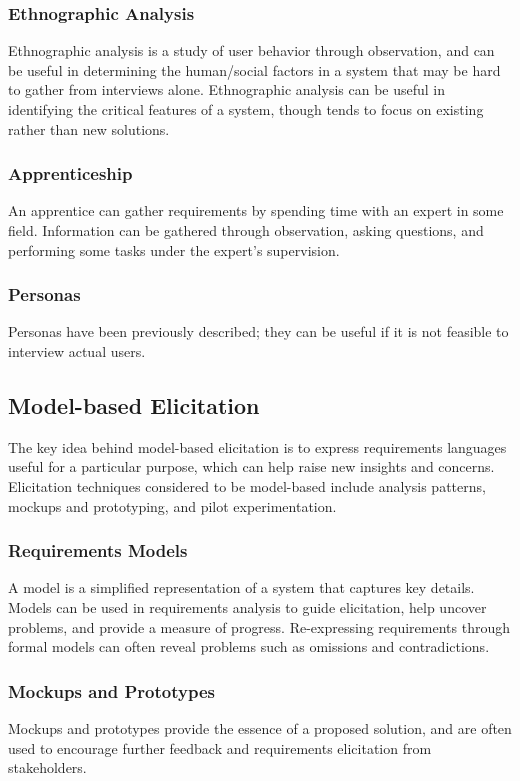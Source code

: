 \documentclass[12pt,titlepage]{article}
\begin{document}
      \subsubsection{Ethnographic Analysis}
        Ethnographic analysis is a study of user behavior through observation, and can be useful in determining the human/social factors in a system that
        may be hard to gather from interviews alone. Ethnographic analysis can be useful in identifying the critical features of a system, though tends to focus on
        existing rather than new solutions.

      \subsubsection{Apprenticeship}
        An apprentice can gather requirements by spending time with an expert in some field. Information can be gathered through observation, asking questions, and
        performing some tasks under the expert's supervision.

      \subsubsection{Personas}
        Personas have been previously described; they can be useful if it is not feasible to interview actual users.

    \subsection{Model-based Elicitation}
      The key idea behind model-based elicitation is to express requirements languages useful for a particular purpose, which can help raise new insights and concerns.
      Elicitation techniques considered to be model-based include analysis patterns, mockups and prototyping, and pilot experimentation.

      \subsubsection{Requirements Models}
        A model is a simplified representation of a system that captures key details. Models can be used in requirements analysis to guide elicitation, help uncover
        problems, and provide a measure of progress. Re-expressing requirements through formal models can often reveal problems such as omissions and contradictions.

      \subsubsection{Mockups and Prototypes}
        Mockups and prototypes provide the essence of a proposed solution, and are often used to encourage further feedback and requirements elicitation from stakeholders.
\end{document}
